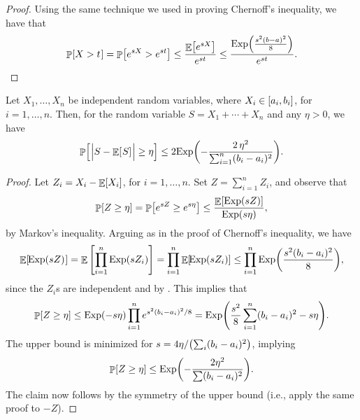 \begin{proof}
    Using the same technique we used in proving Chernoff's inequality,
    we have that
    \begin{align*}
        \Prob{ X > t \MakesBig\ts } = \Prob{ e^{sX} > e^{st} }%
        \leq%
        \frac{\Ex{ e^{sX} }}{e^{st}} \leq \frac{\Exp
           \pth{\frac{s^{2}(b-a)^{2}}{8}}} {e^{st}}.
    \end{align*}
\end{proof}


\begin{fragment}{}
\begin{theorem}
    Let $X_1, \dots, X_n$ be independent random variables, where $X_i
    \in \left[ {a_i, b_i} \right]$, for $i=1,\ldots, n$.  Then, for the random
    variable $ S = X_1 + \cdots + X_n$ and any $\eta > 0$, we have
    \[
        \Prob{\ts \cardin{\Bigl. S - \Ex{\ts S\MakesBig } \ts } \geq
           \eta} \leq 2\Exp \pth{ - \frac{2\,\eta^2}{\sum_{i=1}^n (b_i
              - a_i)^2} }.
    \]


\end{theorem}
\end{fragment}

\begin{proof}
    Let $Z_{i}=X_{i}-\mathop{\mathbb{E}}\!\left[ {X_{i}} \right]$, for $i=1,\ldots, n$.  Set 
    $Z = \sum_{i=1}^{n}Z_{i}$, and observe that 
    \begin{align*}
        \Prob{ Z \geq \eta \MakesBig }  %
        =%
        \Prob{e^{sZ} \geq e^{s \eta}}
        \leq  \frac{\Ex{\Exp\pth{sZ}}}{\Exp(s\eta)},
    \end{align*}
    by Markov's inequality. Arguing as in the proof of Chernoff's
    inequality, we have
    \[
    \Ex{\MakeSBig\! \ts \Exp\pth{sZ}\ts } = \Ex[]{ \prod_{i=1}^{n}
       \Exp\pth{sZ_i}}%
    =%
    \prod_{i=1}^{n} \Ex{ \MakesBig\! \Exp\pth{sZ_i}} \leq
    \prod_{i=1}^{n} \Exp \pth{ \frac{s^{2}(b_{i}-a_{i})^{2}}{8}},
    \]
    since the $Z_i$s are independent and by
    . This implies that
    \begin{align*}
        \Prob{ Z \geq \eta \MakesBig } %
        \leq%
        \Exp(-s\eta) \prod_{i=1}^{n} e^{s^{2}(b_{i}-a_{i})^{2}/8} %
        =%
        \Exp\pth{ \frac{s^{2}}{8}\sum_{i=1}^{n}(b_{i}-a_{i})^{2} -
           s\eta }.
    \end{align*}
    The upper bound is minimized for $s = 4\eta/\pth{\sum_i
       (b_{i}-a_{i})^{2}}$, implying
    \[ 
    \Prob{ Z \geq \eta \MakesBig }%
    \leq%
    \Exp \pth{-\frac{2\eta^{2}}{\sum (b_{i}-a_{i})^{2}}}.
    \]
    The claim now follows by the symmetry of the upper bound (i.e.,
    apply the same proof to $-Z$).
\end{proof}





